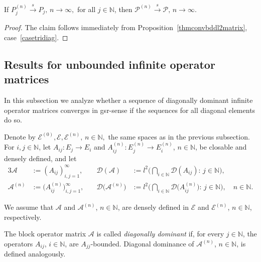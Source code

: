 \documentclass[a4paper,reqno]{amsart}
\begin{document}
\begin{corollary} \label{corcPnscP}
If $P_j^{(n)}{\stackrel{s}{\rightarrow}} P_j, \,n\to\infty,$ for all $j\in{\mathbb{N}}$, then ${\mathcal P}^{(n)}{\stackrel{s}{\rightarrow}}{\mathcal P}, \, n\to\infty$.
\end{corollary}

\begin{proof}
The claim follows immediately from Proposition~\ref{thmconvbddl2matrix}, case~\ref{casetridiag}.
\end{proof}

\subsection{Results for unbounded infinite operator matrices}\label{subsectioninfititegsr}

In this subsection we analyze whether a sequence of diagonally dominant infinite operator matrices converges in gsr-sense if the sequences for all diagonal elements do so.

Denote by  ${\mathcal E}^{(0)}, {\mathcal E}, {\mathcal E}^{(n)}, \,n\in{\mathbb{N}},$ the same spaces as in the previous subsection.
For $i,j\in{\mathbb{N}}$, let $A_{ij}:E_j\to E_i$ and $A_{ij}^{(n)}:E_j^{(n)}\to E_i^{(n)}$, $n\in{\mathbb{N}}$, be closable and densely defined,
and let
\begin{alignat*}{3}
 {\mathcal A}&:=(A_{ij})_{i,j=1}^{\infty}, &\quad {\mathcal D}({\mathcal A})&:=l^2\Big(\underset{i\in{\mathbb{N}}}{\bigcap}{\mathcal D}(A_{ij}):\,j\in{\mathbb{N}}\Big),\\
 {\mathcal A}^{(n)}&:=\big(A_{ij}^{(n)}\big)_{i,j=1}^{\infty}, &\quad {\mathcal D}\big({\mathcal A}^{(n)}\big)&:=l^2\Big(\underset{i\in{\mathbb{N}}}{\bigcap}{\mathcal D}\big(A_{ij}^{(n)}\big):\,j\in{\mathbb{N}}\Big), \quad n\in{\mathbb{N}}.
\end{alignat*}

\noindent
We assume that ${\mathcal A}$ and ${\mathcal A}^{(n)}$, $n\in{\mathbb{N}}$, are densely defined in ${\mathcal E}$ and ${\mathcal E}^{(n)}$, $n\in{\mathbb{N}}$, respectively.

\begin{definition}\label{defdiagdominantinfinite}
The block operator matrix ${\mathcal A}$ is called
\emph{diagonally dominant}  if, for every $j\in{\mathbb{N}}$, the operators $A_{ij}$, $i\in{\mathbb{N}}$, are $A_{jj}$-bounded. 
Diagonal dominance of ${\mathcal A}^{(n)}$, $n\in{\mathbb{N}}$, is defined analogously.
\end{definition}
\end{document}
